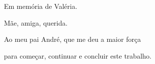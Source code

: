 \newenvironment{dedication}
  {%
   \thispagestyle{empty}%
   \vspace*{\stretch{10}}%
   \itshape             %
   \raggedleft          %
  }
  {\par %
   \vspace{\stretch{2}} %
   \clearpage           %
  }

 \frontmatter              %
 \chapter{}
  \begin{dedication}
    Em memória de Valéria. 
    
    Mãe, amiga, querida. 
    \par   %
    \vspace{2\baselineskip}
    Ao meu pai André, que me deu a maior força 
    
    para começar, continuar e concluir este trabalho.
    
  \end{dedication}
